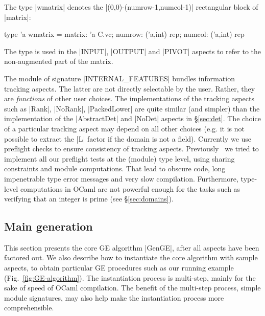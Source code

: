 \documentclass{elsart}
\begin{document}
The type |wmatrix| denotes the |(0,0)-(numrow-1,numcol-1)|
rectangular block of |matrix|:
\begin{code}
type 'a wmatrix = {matrix: 'a C.vc; numrow: ('a,int) rep; 
                   numcol: ('a,int) rep}
\end{code}
The type is used in the |INPUT|, |OUTPUT| and |PIVOT| aspects to refer to
the non-augmented part of the matrix.

The module of signature |INTERNAL_FEATURES| bundles information
tracking aspects. The latter are not directly selectable by the
user. Rather, they are \emph{functions} of other user choices. The
implementations of the tracking aspects such as |Rank|, |NoRank|,
|PackedLower| are quite similar (and simpler) than the implementation
of the |AbstractDet| and |NoDet| aspects in \S\ref{sec:det}. The
choice of a particular tracking aspect may depend on all other choices
(e.g. it is not possible to extract the |L| factor if the domain is
not a field). Currently we use preflight checks to ensure consistency
of tracking aspects. Previously~\cite{CaretteKiselyov05} we tried to
implement all our preflight tests at the (module) type level, using
sharing constraints and module computations. That lead to obscure
code, long impenetrable type error messages and very slow compilation.
Furthermore, type-level computations in OCaml are not
powerful enough for the tasks such as verifying that an
integer is prime (see \S\ref{sec:domains}).

\subsection{Main generation}\label{sec:main-generation}

This section presents the core GE algorithm |GenGE|, after all aspects
have been factored out. We also describe how to instantiate the core
algorithm with sample aspects, to obtain particular GE procedures such
as our running example (Fig.~\ref{fig:GE-algorithm}). The instantiation
process is multi-step, mainly for the sake of speed of OCaml
compilation.  The benefit of the multi-step process, simple
module signatures, may also help make the instantiation process more
comprehensible.
\end{document}
